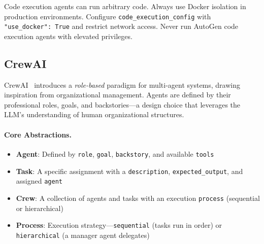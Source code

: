 \begin{warningbox}
Code execution agents can run arbitrary code. Always use Docker isolation in production environments. Configure \texttt{code\_execution\_config} with \texttt{"use\_docker": True} and restrict network access. Never run AutoGen code execution agents with elevated privileges.
\end{warningbox}

\subsection{CrewAI}
\label{subsubsec:crewai}

CrewAI~\cite{moura2023crewai} introduces a \emph{role-based} paradigm for multi-agent systems, drawing inspiration from organizational management. Agents are defined by their professional roles, goals, and backstories---a design choice that leverages the LLM’s understanding of human organizational structures.

\paragraph{Core Abstractions.}
\label{core-abstractions.}

\begin{itemize}
  \item \textbf{Agent}: Defined by \texttt{role}, \texttt{goal}, \texttt{backstory}, and available \texttt{tools}
  \item \textbf{Task}: A specific assignment with a \texttt{description}, \texttt{expected\_output}, and assigned \texttt{agent}
  \item \textbf{Crew}: A collection of agents and tasks with an execution \texttt{process} (sequential or hierarchical)
  \item \textbf{Process}: Execution strategy---\texttt{sequential} (tasks run in order) or \texttt{hierarchical} (a manager agent delegates)
\end{itemize}

